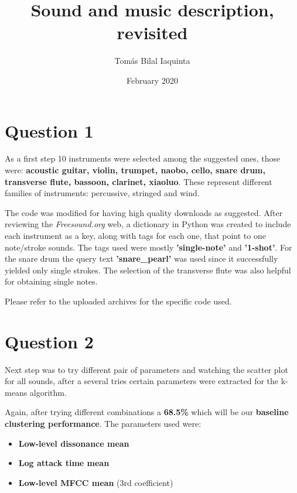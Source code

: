 \documentclass[11pt]{article}
\begin{document}
\title{\vspace{-5cm}Sound and music description, revisited}
\date{February 2020}
\author{Tomás Bilal Iaquinta}

\maketitle
\hrulefill
{}

\section*{Question 1}

As a first step 10 instruments were selected among the suggested ones, those were: \textbf{acoustic guitar, violin, trumpet, naobo, cello, snare drum, transverse flute, bassoon, clarinet, xiaoluo}. These represent different families of instruments: percussive, stringed and wind.\vspace{8pt}

The code was modified for having high quality downloads as suggested. After reviewing the \textit{Freesound.org} web, a dictionary in Python was created to include each instrument as a key, along with tags for each one, that point to one note/stroke sounds. The tags used were mostly \textbf{'single-note'} and \textbf{'1-shot'}. For the snare drum the query text \textbf{'snare\_pearl'} was used since it successfully yielded only single strokes. The selection of the transverse flute was also helpful for obtaining single notes. \vspace{8pt} 

Please refer to the uploaded archives for the specific code used.

\section*{Question 2}

Next step was to try different pair of parameters and watching the scatter plot for all sounds, after a several tries certain parameters were extracted for the k-means algorithm. \vspace{8pt} 

Again, after trying different combinations a \textbf{68.5\%} which will be our \textbf{baseline clustering performance}. The parameters used were:


\begin{itemize}
	\item \textbf{Low-level dissonance mean}
	\item \textbf{Log attack time mean}
	\item \textbf{Low-level MFCC mean} (3rd coefficient)
\end{itemize}
\end{document}
